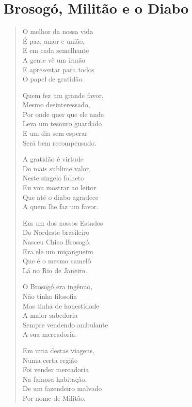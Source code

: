 \chapter{Brosogó, Militão e o Diabo}

\begin{verse}
O melhor da nossa vida\\
É paz, amor e união,\\
E em cada semelhante\\
A gente vê um irmão\\
E apresentar para todos\\
O papel de gratidão.

Quem fez um grande favor,\\
Mesmo desinteressado,\\
Por onde quer que ele ande\\
Leva um tesouro guardado\\
E um dia sem esperar\\
Será bem recompensado.

A gratidão é virtude\\
Do mais sublime valor,\\
Neste singelo folheto\\
Eu vou mostrar ao leitor\\
Que até o diabo agradece\\
A quem lhe faz um favor.

Em um dos nossos Estados\\
Do Nordeste brasileiro\\
Nasceu Chico Brosogó,\\
Era ele um miçangueiro\\
Que é o mesmo camelô\\
Lá no Rio de Janeiro.

O Brosogó era ingênuo,\\
Não tinha filosofia\\
Mas tinha de honestidade\\
A maior sabedoria\\
Sempre vendendo ambulante\\
A sua mercadoria.

Em uma destas viagens,\\
Numa certa região\\
Foi vender mercadoria\\
Na famosa habitação,\\
De um fazendeiro malvado\\
Por nome de Militão.


\end{verse}
